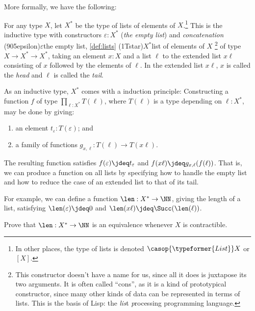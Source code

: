 More formally, we have the following:
\begin{definition}\label{def:lists}
  For any type $X$, let $X^*$ be the type of lists of elements of $X$.\footnote{%
    In other places, the type of lists is denoted $\casop{\typeformer{List}} X$
    or $[X]$.}
  This is the inductive type with constructors $\varepsilon : X^*$
  (\emph{the empty list}) and \emph{concatenation}%
  \glossary(905epsilon){$\varepsilon$}{the empty list, \cref{def:lists}}%
  \glossary(1Tstar){$X^*$}{list of elements of $X$}%
  \footnote{%
    This constructor doesn't have a name for us,
    since all it does is juxtapose its two arguments.
    It is often called ``cons'',
    as it is a kind of prototypical constructor,
    since many other kinds of data can be represented
    in terms of lists. This is the basis of Lisp:
    the \emph{lis}t \emph{p}rocessing programming language.}
  of type $X \to X^* \to X^*$,
  taking an element $x:X$ and a list $\ell$ to the extended list $x\ell$
  consisting of $x$ followed by the elements of $\ell$.
  In the extended list $x\ell$, $x$ is called the \emph{head}
  and $\ell$ is called the \emph{tail}.
\end{definition}

As an inductive type, $X^*$ comes with a induction principle:
Constructing a function $f$ of type $\prod_{\ell:X^*} T(\ell)$,
where $T(\ell)$ is a type depending on $\ell:X^*$,
may be done by giving:
\begin{enumerate}
\item an element $t_\varepsilon : T(\varepsilon)$; and
\item a family of functions $g_{x,\ell} : T(\ell) \to T(x\ell)$.
\end{enumerate}
The resulting function satisfies $f(\varepsilon) \jdeq t_\varepsilon$
and $f(x\ell) \jdeq g_{x,\ell}(f(\ell))$.
That is, we can produce a function on all lists by specifying how
to handle the empty list and how to reduce the case of an
extended list to that of its tail.

For example, we can define a function $\len : X^* \to \NN$,
giving the length of a list,
satisfying $\len(\varepsilon) \jdeq 0$ and $\len(x\ell) \jdeq \Succ(\len(\ell))$.

\begin{xca}\label{xca:list-contr}
  Prove that $\len : X^* \to \NN$ is an equivalence
  whenever $X$ is contractible.
\end{xca}

